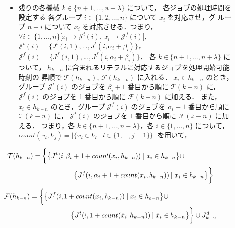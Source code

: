 \documentclass[12pt]{optlab-bachelor}
\begin{document}
\begin{description}
  \item[] ~
  \begin{itemize}
    \item 残りの各機械 $k \in \{n + 1, \ldots , n + \lambda\}$ について，
    各ジョブの処理時間を設定する
    各グループ $i \in \{1,2,\ldots,n\}$ について $x_i$ を対応させ，グ
    ループ $n + i$ について $\bar x_i$ を対応させる．つまり，$\forall
    i \in \{1,\ldots,n\}\big[x_i \to \mathcal{J}^t(i),\ \bar x_i \to
    \mathcal{J}^f(i) \big]$,
    $\mathcal{J}^t(i) = \big\{J^t(i,1),\ldots,J^t(i,\alpha_i +
    \beta_i)\big\}$，$\mathcal{J}^f(i) =
    \big\{J^f(i,1),\ldots,J^f(i,\alpha_i + \beta_i)\big\}$．
    各 $k \in \{n + 1, \ldots , n + \lambda\}$ について，
    $h_{k - n}$ に含まれるリテラルに対応するジョブを処理開始可能時刻の
    昇順で $\mathcal{T}(h_{k - n})$, $\mathcal{F}(h_{k - n})$ に入れる．
    $x_i \in h_{k - n}$ のとき，グループ $\mathcal{J}^t(i)$ のジョブを
    $\beta_i + 1$ 番目から順に $\mathcal{T}(k - n)$ に，
    $\mathcal{J}^f(i)$ のジョブを 1 番目から順に $\mathcal{F}(k - n)$ に加える．
    また，$\bar x_i \in h_{k - n}$ のとき，グループ $\mathcal{J}^f(i)$
    のジョブを $\alpha_i + 1$ 番目から順に $\mathcal{T}(k - n)$ に，
    $\mathcal{J}^t(i)$ のジョブを 1 番目から順に $\mathcal{F}(k - n)$ に加える．
    つまり，各 $k \in \{n + 1, \ldots,n + \lambda\}$，各 $i \in \{1,\ldots,n\}$
    について，$count(x_i,h_j) = \big|\big\{x_i \in h_l \mid l \in \{1,\ldots,j -
    1\}\big\}\big|$ を用いて，
  \end{itemize}
\end{description}
\begin{equation}
  \begin{split}
    \mathcal{T}(h_{k - n}) &= \bigg\{\big\{J^t(i,\beta_i + 1 +
    count(x_i,h_{k - n})) \mid x_i \in h_{k - n}\big\} \cup \\ &\qquad \qquad\qquad \big\{J^f(i,\alpha_i + 1 + count(\bar x_i, h_{k - n})) \mid \bar x_i \in h_{k - n}\big\}\bigg\} \notag
  \end{split}
\end{equation}
\begin{equation}
  \begin{split}
    \mathcal{F}(h_{k - n}) &= \bigg\{\big\{J^f(i,1 + count(
    x_i,h_{k - n})) \mid x_i \in h_{k - n} \big\} \cup \\ &\qquad\qquad\qquad \big\{J^t(i,1 + count(\bar x_i,h_{k - n})) \mid \bar x_i \in h_{k - n}\big\} \bigg\} \cup J^d_{k - n} \notag
  \end{split}
\end{equation}
\end{document}
